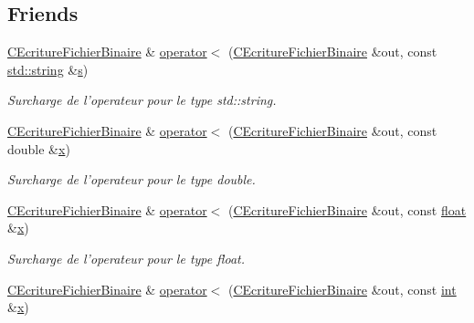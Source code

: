 \subsection*{Friends}
\begin{DoxyCompactItemize}
\item 
\hyperlink{class_c_ecriture_fichier_binaire}{C\-Ecriture\-Fichier\-Binaire} \& \hyperlink{class_c_ecriture_fichier_binaire_a2c88c30ff08c7d9035596e0187d44e45}{operator$<$} (\hyperlink{class_c_ecriture_fichier_binaire}{C\-Ecriture\-Fichier\-Binaire} \&out, const \hyperlink{glew_8h_ae84541b4f3d8e1ea24ec0f466a8c568b}{std\-::string} \&\hyperlink{glew_8h_a4af680a6c683f88ed67b76f207f2e6e4}{s})
\begin{DoxyCompactList}\small\item\em Surcharge de l'operateur pour le type {\itshape std\-::string}. \end{DoxyCompactList}\item 
\hyperlink{class_c_ecriture_fichier_binaire}{C\-Ecriture\-Fichier\-Binaire} \& \hyperlink{class_c_ecriture_fichier_binaire_afcaa555d19b37490df9fda731cf8cb19}{operator$<$} (\hyperlink{class_c_ecriture_fichier_binaire}{C\-Ecriture\-Fichier\-Binaire} \&out, const double \&\hyperlink{glew_8h_ad77deca22f617d3f0e0eb786445689fc}{x})
\begin{DoxyCompactList}\small\item\em Surcharge de l'operateur pour le type {\itshape double}. \end{DoxyCompactList}\item 
\hyperlink{class_c_ecriture_fichier_binaire}{C\-Ecriture\-Fichier\-Binaire} \& \hyperlink{class_c_ecriture_fichier_binaire_a68e43a125ee6c25828485dfb7270fdea}{operator$<$} (\hyperlink{class_c_ecriture_fichier_binaire}{C\-Ecriture\-Fichier\-Binaire} \&out, const \hyperlink{fmod_8h_aeb841aa4b4b5f444b5d739d865b420af}{float} \&\hyperlink{glew_8h_ad77deca22f617d3f0e0eb786445689fc}{x})
\begin{DoxyCompactList}\small\item\em Surcharge de l'operateur pour le type {\itshape float}. \end{DoxyCompactList}\item 
\hyperlink{class_c_ecriture_fichier_binaire}{C\-Ecriture\-Fichier\-Binaire} \& \hyperlink{class_c_ecriture_fichier_binaire_a57ac55aefec2f3dd683cef75c409944b}{operator$<$} (\hyperlink{class_c_ecriture_fichier_binaire}{C\-Ecriture\-Fichier\-Binaire} \&out, const \hyperlink{wglew_8h_a500a82aecba06f4550f6849b8099ca21}{int} \&\hyperlink{glew_8h_ad77deca22f617d3f0e0eb786445689fc}{x})

\end{DoxyCompactItemize}
